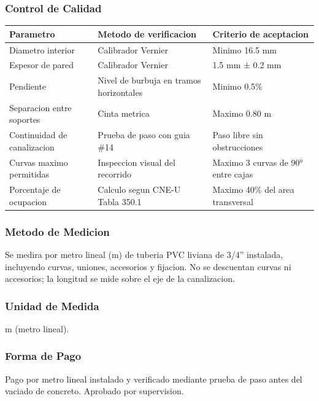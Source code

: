 \subsubsection{Control de Calidad}

\begin{longtable}{L{4.5cm} L{4.5cm} L{4.5cm}}
\toprule
\textbf{Parametro} & \textbf{Metodo de verificacion} & \textbf{Criterio de aceptacion} \\
\midrule
Diametro interior & Calibrador Vernier & Minimo 16.5 mm \\
Espesor de pared & Calibrador Vernier & 1.5 mm ± 0.2 mm \\
Pendiente & Nivel de burbuja en tramos horizontales & Minimo 0.5\% \\
Separacion entre soportes & Cinta metrica & Maximo 0.80 m \\
Continuidad de canalizacion & Prueba de paso con guia \#14 & Paso libre sin obstrucciones \\
Curvas maximo permitidas & Inspeccion visual del recorrido & Maximo 3 curvas de 90° entre cajas \\
Porcentaje de ocupacion & Calculo segun CNE-U Tabla 350.1 & Maximo 40\% del area transversal \\
\bottomrule
\end{longtable}

\subsubsection{Metodo de Medicion}

Se medira por metro lineal (m) de tuberia PVC liviana de 3/4'' instalada, incluyendo curvas, uniones, accesorios y fijacion. No se descuentan curvas ni accesorios; la longitud se mide sobre el eje de la canalizacion.

\subsubsection{Unidad de Medida}

m (metro lineal).

\subsubsection{Forma de Pago}

Pago por metro lineal instalado y verificado mediante prueba de paso antes del vaciado de concreto. Aprobado por supervision.

